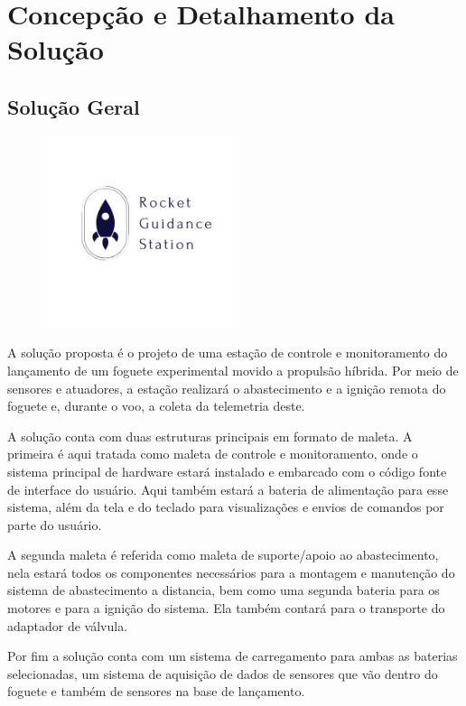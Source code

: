 \part{Concepção e Detalhamento da Solução}

\chapter{Solução Geral}

\begin{figure}[H]
    \centering
    \includegraphics[width=0.5\textwidth]{figuras/4.png}
\end{figure}

\par A solução proposta é o projeto de uma estação de controle e monitoramento do lançamento de um foguete experimental movido a propulsão híbrida. Por meio de sensores e atuadores, a estação realizará o abastecimento e a ignição remota do foguete e, durante o voo, a coleta da telemetria deste.

\par A solução conta com duas estruturas principais em formato de maleta. A primeira é aqui tratada como maleta de controle e monitoramento, onde o sistema principal de hardware estará instalado e embarcado com o código fonte de interface do usuário. Aqui também estará a bateria de alimentação para esse sistema, além da tela e do teclado para visualizações e envios de comandos por parte do usuário. 

\par A segunda maleta é referida como maleta de suporte/apoio ao abastecimento, nela estará todos os componentes necessários para a montagem e manutenção do sistema de abastecimento a distancia, bem como uma segunda bateria para os motores e para a ignição do sistema. Ela também contará para o transporte do adaptador de válvula.

\par Por fim a solução conta com um sistema de carregamento para ambas as baterias selecionadas, um sistema de aquisição de dados de sensores que vão dentro do foguete e também de sensores na base de lançamento.










